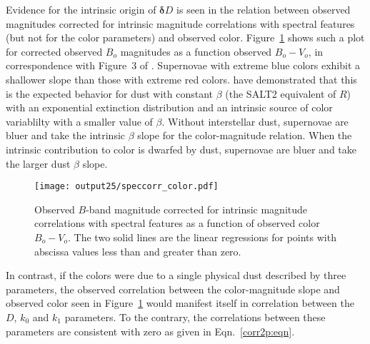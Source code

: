 \documentclass{aastex61}   	%
\begin{document}
Evidence for the intrinsic origin of $\pmb{\delta}D$ is seen in the relation between observed magnitudes corrected for intrinsic magnitude correlations with
spectral features (but not for the color parameters)
and observed  color.  Figure~\ref{speccorr:fig} shows such a plot for corrected observed $B_o$ magnitudes
as a function observed $B_o-V_o$, in correspondence with Figure~3 of  \citet{2017ApJ...842...93M}.  Supernovae with extreme blue colors exhibit a shallower slope than those
with extreme red colors.   \citet{2017ApJ...842...93M} have demonstrated that this is the expected behavior for
dust with constant $\beta$ (the SALT2 equivalent of $R$) with an exponential extinction distribution and an intrinsic source of color variablilty
with a smaller value of $\beta$.  Without interstellar dust, supernovae are bluer and take the intrinsic $\beta$ slope for the color-magnitude
relation.  When the intrinsic contribution to color is dwarfed by dust, supernovae are bluer and take the larger dust $\beta$ slope.



\begin{figure}[htbp] %
   \centering
   \texttt{[image: output25/speccorr\_color.pdf]}
      \caption{
      \color{red}Observed $B$-band magnitude corrected for intrinsic magnitude correlations with spectral features as a function of observed color $B_o-V_o$.
      The two solid lines are the linear regressions for points with abscissa values less than and greater than zero.
	\color{black}
   \label{speccorr:fig}}
\end{figure}


In contrast, if the colors were due to a single physical dust described by three parameters,
the observed correlation between the color-magnitude slope and observed color seen in Figure~\ref{speccorr:fig}
would manifest itself in correlation between the $D$,
$k_0$ and $k_1$ parameters.  To the contrary,
the correlations between these parameters  are consistent with zero as given  in Eqn.~\ref{corr2p:eqn}.
\end{document}
